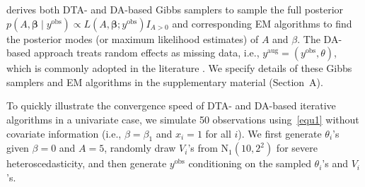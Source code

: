 \documentclass[12pt]{article}
\begin{document}



\cite{kelly2014advances} derives both DTA- and DA-based Gibbs samplers to sample the full posterior $p(A, \boldsymbol{\beta}\mid y^{\textrm{obs}})\propto L(A, \boldsymbol{\beta}; y^{\textrm{obs}})I_{A>0}$ and corresponding EM algorithms to find the posterior modes (or maximum likelihood estimates) of $A$ and $\beta$. The DA-based approach treats random effects as missing data, i.e., $y^{\textrm{aug}}=(y^{\textrm{obs}}, \theta)$, which is commonly adopted in the literature \citep{morris1987comment}. We specify  details of these Gibbs samplers and EM algorithms in the supplementary material (Section~A). 



To quickly illustrate the convergence speed of DTA- and DA-based iterative algorithms in a univariate case, we simulate 50 observations using~\eqref{equ1} without covariate information (i.e., $\beta=\beta_1$ and $x_i=1$ for all $i$). We first generate $\theta_i$'s given $\beta=0$ and $A=5$, randomly draw  $V_i$'s  from $\textrm{N}_1(10, 2^2)$ for severe heteroscedasticity, and then generate $y^{\textrm{obs}}$ conditioning on  the sampled $\theta_i$'s and $V_i$'s. 
\end{document}
